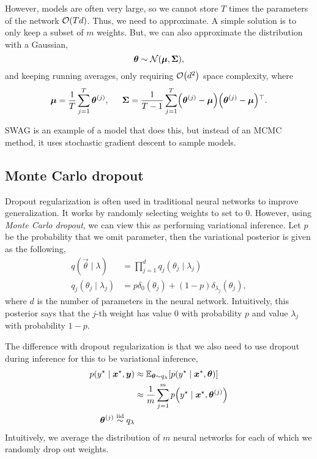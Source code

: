 However, models are often very large, so we cannot store $T$ times the
parameters of the network $\bigo{Td}$. Thus, we need to approximate. A simple
solution is to only keep a subset of $m$ weights. But, we can also
approximate the distribution with a Gaussian, \[
  \vec{\theta} \sim \mathcal{N}\lft(\vec{\mu},\mat{\Sigma} \rgt)
,\]
and keeping running averages, only requiring $\bigo{d^2}$ space complexity,
where \[
  \vec{\mu} = \frac{1}{T} \sum_{j=1}^T \vec{\theta}^{(j)}, \hspace{1.5em} \mat{\Sigma} = \frac{1}{T-1}\sum_{j=1}^T \lft( \vec{\theta}^{(j)} - \vec{\mu} \rgt) \transpose{\lft( \vec{\theta}^{(j)} - \vec{\mu} \rgt)}
.\]

SWAG \citep{maddox2019simple} is an example of a model that does this, but
instead of an MCMC method, it uses stochastic gradient descent to sample
models.

\subsection{Monte Carlo dropout}

Dropout regularization is often used in traditional neural networks to improve
generalization. It works by randomly selecting weights to set to 0. However,
using \textit{Monte Carlo dropout}, we can view this as performing variational
inference. Let $p$ be the probability that we omit parameter, then the
variational posterior is given as the following,
\begin{align*}
  q(\vec{\theta}\mid \lambda) &= \prod_{j=1}^d q_j(\theta_j\mid \lambda_j) \\
  q_j(\theta_j \mid \lambda_j) &= p \delta_0(\theta_j) + (1-p) \delta_{\lambda_j}(\theta_j)
,\end{align*}
where $d$ is the number of parameters in the neural network. Intuitively, this
posterior says that the $j$-th weight has value $0$ with probability $p$ and
value $\lambda_j$ with probability $1-p$.

The difference with dropout regularization is that we also need to use dropout
during inference for this to be variational inference,
\begin{align*}
  p(y^\star \mid \vec{x}^\star, \vec{y}) &\approx \E_{\vec{\theta}\sim q_{\lambda}}[p(y^\star \mid \vec{x}^\star, \vec{\theta})] \\
  &\approx \frac{1}{m} \sum_{j=1}^m p \lft( y^\star \mid \vec{x}^\star, \vec{\theta}^{(j)} \rgt) \\
  \vec{\theta}^{(j)} \sampleiid q_{\lambda}
\end{align*}
Intuitively, we average the distribution of $m$ neural networks for each of
which we randomly drop out weights.

